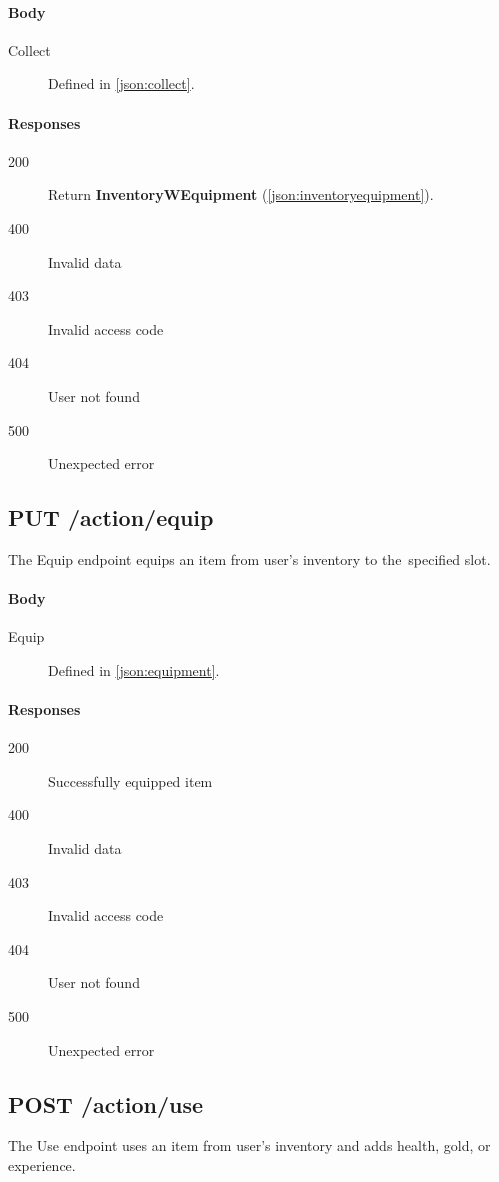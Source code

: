 		\paragraph*{Body}
			\begin{description}
				\item[Collect] Defined in \ref{json:collect}.
			\end{description}
		\paragraph*{Responses}
			\begin{description}		
				\item[200] Return \textbf{InventoryWEquipment} (\ref{json:inventoryequipment}).
				\item[400] Invalid data
				\item[403] Invalid access code
				\item[404] User not found
				\item[500] Unexpected error
			\end{description}
	
	\subsection{PUT /action/equip}
	The Equip endpoint equips an item from user's inventory to the~specified slot.
		\paragraph*{Body}
			\begin{description}
				\item[Equip] Defined in \ref{json:equipment}.
			\end{description}
		\paragraph*{Responses}
			\begin{description}		
				\item[200] Successfully equipped item
				\item[400] Invalid data
				\item[403] Invalid access code
				\item[404] User not found
				\item[500] Unexpected error
			\end{description}
	
	\subsection{POST /action/use}
	The Use endpoint uses an item from user's inventory and adds health, gold, or experience.
